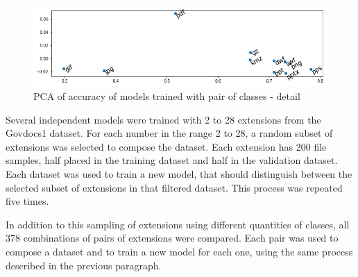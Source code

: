 \noindent
\begin{figure}[htb!]
\centering\includegraphics[width=1.0\textwidth]{content/pca2.png}
\caption{\label{fig:pca2}PCA of accuracy of models trained with pair of classes - detail}%
\end{figure}






Several independent models were trained with 2 to 28 extensions from the Govdocs1 dataset. For each number in the range 2 to 28, a random subset of extensions was selected to compose the dataset. Each extension has 200 file samples, half placed in the training dataset and half in the validation dataset. Each dataset was used to train a new model, that should distinguish between the selected subset of extensions in that filtered dataset. This process was repeated five times.



In addition to this sampling of extensions using different quantities of classes, all 378 combinations of pairs of extensions were compared. Each pair was used to compose a dataset and to train a new model for each one, using the same process described in the previous paragraph.


